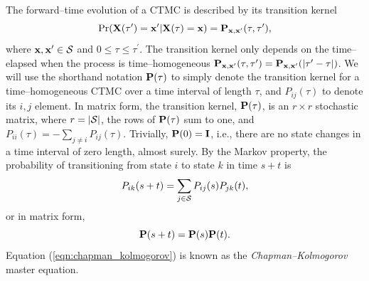 The forward--time evolution of a CTMC is described by its transition kernel $$\Pr(\mathbf{X}(\tau^\prime) = \mathbf{x}^\prime | \mathbf{X}(\tau) = \mathbf{x}) = \mathbf{P}_{\mathbf{x},\mathbf{x}^\prime}(\tau,\tau^\prime),$$
where $ \mathbf{x},\mathbf{x}^\prime\in\mathcal{S} $ and $ 0\leq\tau\leq\tau^\prime $. The transition kernel only depends on the time--elapsed when the process is time--homogeneous $ \mathbf{P}_{\mathbf{x},\mathbf{x}^\prime}(\tau,\tau^\prime) = \mathbf{P}_{\mathbf{x},\mathbf{x}^\prime}(|\tau^\prime - \tau|)$. We will use the shorthand notation $ \mathbf{P}(\tau) $ to simply denote the transition kernel for a time--homogeneous CTMC over a time interval of length $ \tau $, and $ P_{ij}(\tau) $ to denote its $ i,j $ element. 
In matrix form, the transition kernel, $ \mathbf{P}(\tau) $, is an $ r\times r $ stochastic matrix, where $ r = |\mathcal{S}| $, the rows of $ \mathbf{P}(\tau) $ sum to one, and $ P_{ii}(\tau) = -\sum_{j\neq i}P_{ij}(\tau)$. 
Trivially, $ \mathbf{P}(0) = \mathbf{I} $, i.e., there are no state changes in a time interval of zero length, almost surely. By the Markov property, the probability of transitioning from state $ i $ to state $ k $ in time $ s+t $ is 
\begin{equation}
\label{eqn:chapman_kolmogorov}
P_{ik}(s+t) = \sum_{j\in\mathcal{S}}P_{ij}(s)P_{jk}(t),
\end{equation}
or in matrix form, $$\mathbf{P}(s+t) = \mathbf{P}(s)\mathbf{P}(t).$$
Equation (\ref{eqn:chapman_kolmogorov}) is known as the \textit{Chapman--Kolmogorov} master equation. 

